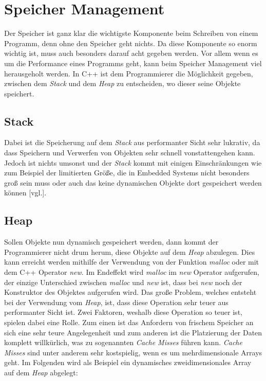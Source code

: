 \section{Speicher Management}\label{sec:speicherman}
Der Speicher ist ganz klar die wichtigste Komponente beim Schreiben von einem Programm, denn ohne
den Speicher geht nichts. Da diese Komponente so enorm wichtig ist, muss auch besonders darauf
acht gegeben werden. Vor allem wenn es um die Performance eines Programms geht, kann beim
Speicher Management viel herausgeholt werden. In C++ ist dem Programmierer die Möglichkeit
gegeben, zwischen dem \emph{Stack} und dem \emph{Heap} zu entscheiden, wo dieser seine Objekte
speichert.

\subsection{Stack}
Dabei ist die Speicherung auf dem \emph{Stack} aus performanter Sicht sehr lukrativ, da dass
Speichern und Verwerfen von Objekten sehr schnell vonstattengehen kann. Jedoch ist nichts
umsonst und der \emph{Stack} kommt mit einigen Einschränkungen wie zum Beispiel der limitierten Größe,
die in Embedded Systems nicht besonders groß sein muss oder auch das keine dynamischen Objekte
dort gespeichert werden können \cite{C++HighPer2}[vgl.].

\subsection{Heap}
Sollen Objekte nun dynamisch gespeichert werden, dann kommt der Programmierer nicht drum herum,
diese Objekte auf dem \emph{Heap} abzulegen. Dies kann erreicht werden mithilfe der Verwendung von
der Funktion \emph{malloc} oder mit dem C++ Operator \emph{new}. Im Endeffekt wird \emph{malloc}
im \emph{new} Operator aufgerufen, der einzige Unterschied zwischen \emph{malloc} und \emph{new}
ist, dass bei \emph{new} noch der Konstruktor des Objektes aufgerufen wird. Das große Problem,
welches entsteht bei der Verwendung vom \emph{Heap}, ist, dass diese Operation sehr teuer aus
performanter Sicht ist. Zwei Faktoren, weshalb diese Operation so teuer ist, spielen dabei eine
Rolle. Zum einen ist das Anfordern von frischem Speicher an sich eine sehr teure Angelegenheit
und zum anderen ist die Platzierung der Daten komplett willkürlich, was zu sogenannten
\emph{Cache Misses} führen kann.
\newline
\newline
\emph{Cache Misses} sind unter anderem sehr kostspielig, wenn es um mehrdimensionale Arrays geht.
Im Folgenden wird als Beispiel ein dynamisches zweidimensionales Array auf dem \emph{Heap} abgelegt:

